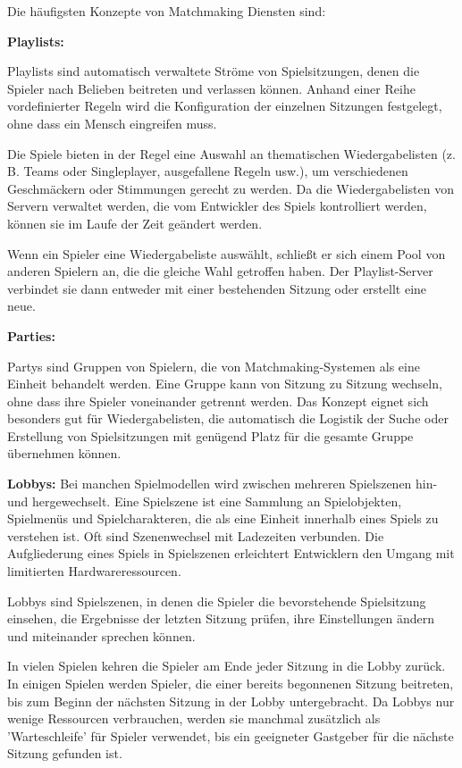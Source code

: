 Die häufigsten Konzepte von Matchmaking Diensten sind:

\textbf{Playlists:}

Playlists sind automatisch verwaltete Ströme von Spielsitzungen, denen die Spieler nach Belieben beitreten und verlassen können. Anhand einer Reihe vordefinierter Regeln wird die Konfiguration der einzelnen Sitzungen festgelegt, ohne dass ein Mensch eingreifen muss.  

Die Spiele bieten in der Regel eine Auswahl an thematischen Wiedergabelisten (z. B. Teams oder Singleplayer, ausgefallene Regeln usw.), um verschiedenen Geschmäckern oder Stimmungen gerecht zu werden. Da die Wiedergabelisten von Servern verwaltet werden, die vom Entwickler des Spiels kontrolliert werden, können sie im Laufe der Zeit geändert werden.

Wenn ein Spieler eine Wiedergabeliste auswählt, schließt er sich einem Pool von anderen Spielern an, die die gleiche Wahl getroffen haben. Der Playlist-Server verbindet sie dann entweder mit einer bestehenden Sitzung oder erstellt eine neue. 

\cite{Wikipedia.2021b}

\textbf{Parties:}

Partys sind Gruppen von Spielern, die von Matchmaking-Systemen als eine Einheit behandelt werden. Eine Gruppe kann von Sitzung zu Sitzung wechseln, ohne dass ihre Spieler voneinander getrennt werden. Das Konzept eignet sich besonders gut für Wiedergabelisten, die automatisch die Logistik der Suche oder Erstellung von Spielsitzungen mit genügend Platz für die gesamte Gruppe übernehmen können.

\cite{Wikipedia.2021b} 

\textbf{Lobbys:}
Bei manchen Spielmodellen wird zwischen mehreren Spielszenen hin- und hergewechselt. Eine Spielszene ist eine Sammlung an Spielobjekten, Spielmenüs und Spielcharakteren, die als eine Einheit innerhalb eines Spiels zu verstehen ist. Oft sind Szenenwechsel mit Ladezeiten verbunden. Die Aufgliederung eines Spiels in Spielszenen erleichtert Entwicklern den Umgang mit limitierten Hardwareressourcen. \cite{Wikipedia.2012}

Lobbys sind Spielszenen, in denen die Spieler die bevorstehende Spielsitzung einsehen, die Ergebnisse der letzten Sitzung prüfen, ihre Einstellungen ändern und miteinander sprechen können.

In vielen Spielen kehren die Spieler am Ende jeder Sitzung in die Lobby zurück. In einigen Spielen werden Spieler, die einer bereits begonnenen Sitzung beitreten, bis zum Beginn der nächsten Sitzung in der Lobby untergebracht. Da Lobbys nur wenige Ressourcen verbrauchen, werden sie manchmal zusätzlich als 'Warteschleife' für Spieler verwendet, bis ein geeigneter Gastgeber für die nächste Sitzung gefunden ist.

